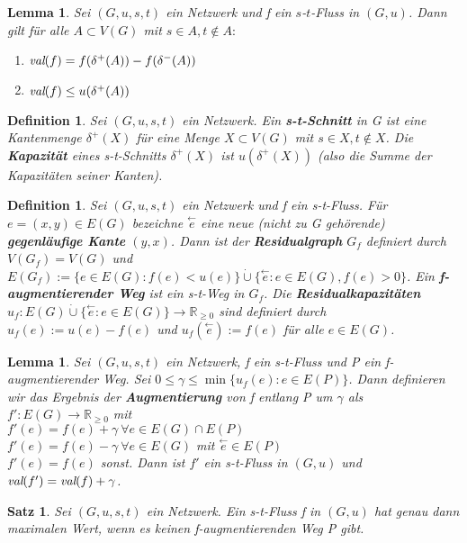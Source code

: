\documentclass[12pt,a4paper]{article}
\theoremstyle{plain}
\newtheorem{Satz}[Theorem]{Satz}
\newtheorem{Lemma}[Theorem]{Lemma}
\newtheorem{Definition}[Theorem]{Definition}
\newcommand{\herv}[1]{{\emph{\textbf{#1}}}}
\newcommand{\R}{\mathbb{R}}
\newcommand{\cupdot}{\mathbin{\dot{\cup}}}
\numberwithin{equation}{section}
\begin{document}
\begin{Lemma}
Sei $(G,u,s,t)$ ein Netzwerk und f ein $s$-$t$-Fluss in $(G,u)$. Dann gilt für alle $A\subset V(G)$ mit $s\in A, t\not\in A:$
\begin{enumerate}
\renewcommand{\labelenumi}{\emph{(\alph{enumi})}}
\item $\emph{val}(f) = f(\delta^+(A))-f(\delta^-(A))$
\item $\emph{val}(f)\leq u(\delta^+(A))$
\end{enumerate}
\end{Lemma}
\begin{Definition}
Sei $(G,u,s,t)$ ein Netzwerk. Ein \herv{s-t-Schnitt} in G ist eine Kantenmenge $\delta^+(X)$ für eine Menge $X\subset V(G)$ mit $s\in X, t\not\in X$. Die \herv{Kapazität} eines s-t-Schnitts $\delta^+(X)$ ist $u(\delta^ +(X))$ (also die Summe der Kapazitäten seiner Kanten).
\end{Definition}
\begin{Definition}
Sei $(G,u,s,t)$ ein Netzwerk und f ein s-t-Fluss. Für $e=(x,y)\in E(G)$ bezeichne $\stackrel{\leftarrow}{e}$ eine neue (nicht zu G gehörende) \herv{gegenläufige Kante} $(y,x)$. Dann ist der \herv{Residualgraph} $G_f$ definiert durch $V(G_f)=V(G)$ und $E(G_f):=\{e\in E(G):f(e)<u(e)\} \cupdot \{\stackrel{\leftarrow}{e}:e\in E(G), f(e)>0\}$. Ein \textbf{f-}\herv{augmentierender Weg} ist ein s-t-Weg in $G_f$. Die \herv{Residualkapazitäten} $u_f:E(G)\cupdot \{\stackrel{\leftarrow}{e} :e\in E(G)\}\rightarrow \R_{\geq 0}$ sind definiert durch $u_f(e):=u(e)-f(e)$ und $u_f(\stackrel{\leftarrow}{e}):=f(e)$ für alle $e\in E(G)$.
\end{Definition}
\begin{Lemma}
Sei $(G,u,s,t)$ ein Netzwerk, f ein s-t-Fluss und P ein f-augmentierender Weg. Sei $0\leq\gamma\leq\min\{u_f(e):e\in E(P)\}$. Dann definieren wir das Ergebnis der \herv{Augmentierung} von f entlang P um $\gamma$ als $f':E(G)\rightarrow \R_{\geq 0}$ mit \\$f'(e)=f(e)+\gamma\ \forall e\in E(G) \cap E(P)$\\
$f'(e)=f(e)-\gamma\ \forall e\in E(G)$ mit $\stackrel{\leftarrow}{e}\in E(P)$\\
$f'(e)=f(e)$ sonst. Dann ist $f'$ ein s-t-Fluss in $(G,u)$ und $\emph{val}(f')=\emph{val}(f)+\gamma$.
\end{Lemma}
\begin{Satz}
Sei $(G,u,s,t)$ ein Netzwerk. Ein s-t-Fluss f in $(G,u)$ hat genau dann maximalen Wert, wenn es keinen f-augmentierenden Weg P gibt.
\end{Satz}
\end{document}
